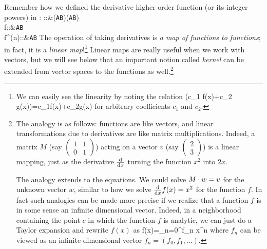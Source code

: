 Remember how we defined the derivative higher order function (or its integer powers) in :
\bea 
{}::{}&\left(\texttt{A}\to\texttt{B}\right)\to\left(\texttt{A}\to\texttt{B}\right)\\
f::{}&\texttt{A}\to\texttt{B}\\
f^{(n)}::{}&\texttt{A}\to\texttt{B}
\eea  
The operation of taking derivatives is \emph{a map of functions to functions}; in fact, it is a \emph{linear map}!\footnote{We can easily see the linearity by noting the relation
\be 
{}\left(c_1 f(x)+c_2 g(x)\right)=c_1f(x)+c_2g(x)
\ee 
for arbitrary coefficients $c_1$ and $c_2$.
} Linear maps are really useful when we work with vectors, but we will see below that an important notion called \emph{kernel} can be extended from vector spaces to the functions as well.\footnote{
The analogy is as follows: functions are like vectors, and linear transformations due to derivatives are like matrix multiplications. Indeed, a matrix $M$ (say $\begin{pmatrix}
1&1\\0&1
\end{pmatrix}$) acting on a vector $v$ (say $\begin{pmatrix}
2\\3
\end{pmatrix}$) is a linear mapping, just as the derivative $\rdr{}{x}$ turning the function $x^2$ into $2x$.

The analogy extends to the equations. We could solve $M\.w=v$ for the unknown vector $w$, similar to how we solve $\rdr{}{x}f(x)=x^2$ for the function $f$. In fact such analogies can be made more precise if we realize that a function $f$ is in some sense an infinite dimensional vector. Indeed, in a neighborhood containing the point $c$ in which the function $f$ is analytic, we can just do a Taylor expansion and rewrite $f(x)$ as 
\be 
f(x)=\sum\limits_{n=0}^{\infty}f_n x^n
\ee  
where $f_n$ can be viewed as an infinite-dimensional vector $f_n=\left(f_0,f_1,\dots\right)$.\footnotemark
} 

